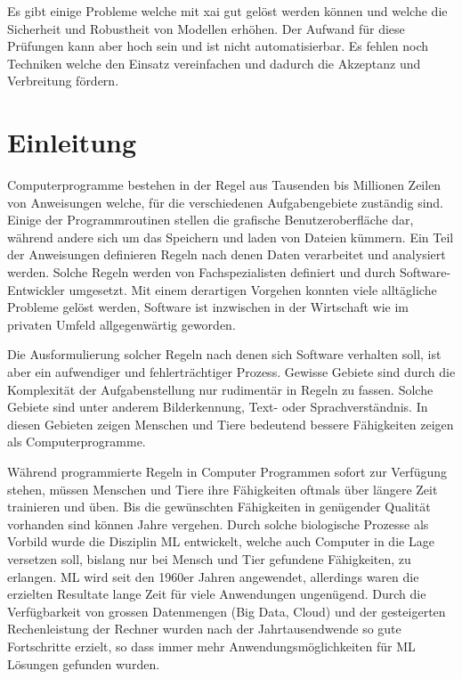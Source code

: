 \documentclass[
  12pt, %
  a4paper, %
  oneside, %
  openany, 
  numbers=noenddot, %
  BCOR=5mm, %
  parskip=half*, %
  thesis, %
]{bfhbook}
\begin{document}
Es gibt einige Probleme welche mit \Gls{xai} gut gelöst werden können und welche die Sicherheit und Robustheit von Modellen erhöhen. Der Aufwand für diese Prüfungen kann aber hoch sein und ist nicht automatisierbar. Es fehlen noch Techniken welche den Einsatz vereinfachen und dadurch die Akzeptanz und Verbreitung fördern.

\chapter{Einleitung}
Computerprogramme bestehen in der Regel aus Tausenden bis Millionen Zeilen von Anweisungen welche, für die verschiedenen Aufgabengebiete zuständig sind. Einige der Programmroutinen stellen die grafische Benutzeroberfläche dar, während andere sich um das Speichern und laden von Dateien kümmern. Ein Teil der Anweisungen definieren Regeln nach denen Daten verarbeitet und analysiert werden. Solche Regeln werden von Fachspezialisten definiert und durch Software-Entwickler umgesetzt. Mit einem derartigen Vorgehen konnten viele alltägliche Probleme gelöst werden, Software ist inzwischen in der Wirtschaft wie im privaten Umfeld allgegenwärtig geworden. 

Die Ausformulierung solcher Regeln nach denen sich Software verhalten soll, ist aber ein aufwendiger und fehlerträchtiger Prozess. Gewisse Gebiete sind durch die Komplexität der Aufgabenstellung nur rudimentär in Regeln zu fassen. Solche Gebiete sind unter anderem Bilderkennung, Text- oder Sprachverständnis. In diesen Gebieten zeigen Menschen und Tiere bedeutend bessere Fähigkeiten zeigen als Computerprogramme. 

Während programmierte Regeln in Computer Programmen sofort zur Verfügung stehen, müssen Menschen und Tiere ihre Fähigkeiten oftmals über längere Zeit trainieren und üben. Bis die gewünschten Fähigkeiten in genügender Qualität vorhanden sind können Jahre vergehen. Durch solche biologische Prozesse als Vorbild wurde die Disziplin \gls{ML} entwickelt, welche auch Computer in die Lage versetzen soll, bislang nur bei Mensch und Tier gefundene Fähigkeiten, zu erlangen.
\gls{ML} wird seit den 1960er Jahren angewendet, allerdings waren die erzielten Resultate lange Zeit für viele Anwendungen ungenügend. Durch die Verfügbarkeit von grossen Datenmengen (Big Data, Cloud) und der gesteigerten Rechenleistung der Rechner wurden nach der Jahrtausendwende so gute Fortschritte erzielt, so dass immer mehr Anwendungsmöglichkeiten für \gls{ML} Lösungen gefunden wurden. 
\end{document}
